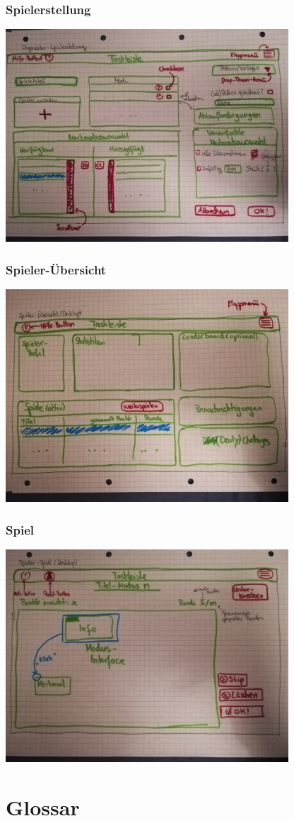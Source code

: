 \documentclass[a4paper]{scrreprt}
\begin{document}
    \subsection{Spielerstellung}
    \centering
    \includegraphics[width=400px]{../pictures/4_Spielerstellung.jpg}

    \subsection{Spieler-Übersicht}
    \label{fig:Spieler-Übersicht}
    \centering
    \includegraphics[width=400px]{../pictures/5_Spieler.jpg}

    \subsection{Spiel}
    \centering
    \includegraphics[width=400px]{../pictures/6_Spiel.jpg}

    \clearpage


    \chapter{Glossar}

    \printglossary
\end{document}
